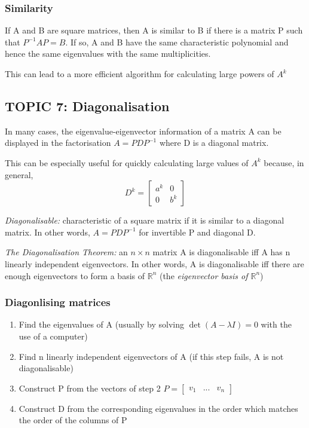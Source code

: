 \documentclass[12pt]{article} %
\newcommand{\R}{\mathbb{R}}
\begin{document}
\subsubsection{Similarity}
If A and B are square matrices, then A is similar to B if there is a matrix P such that $P^{-1} AP = B$. If so, A and B have the same characteristic polynomial and hence the same eigenvalues with the same multiplicities.

This can lead to a more efficient algorithm for calculating large powers of $A^k$

\subsection{TOPIC 7: Diagonalisation}
In many cases, the eigenvalue-eigenvector information of a matrix A can be displayed in the factorisation $A = PDP^{-1}$ where D is a diagonal matrix.

This can be especially useful for quickly calculating large values of $A^k$ because, in general, 
$$D^k = \begin{bmatrix}
	a^k & 0\\
	0 & b^k
\end{bmatrix}$$

\emph{Diagonalisable:} characteristic of a square matrix if it is similar to a diagonal matrix. In other words, $A = PDP^{-1}$ for invertible P and diagonal D. 

\emph{The Diagonalisation Theorem:} an $n \times n$ matrix A is diagonalisable iff A has n linearly independent eigenvectors. 
In other words, A is diagonalisable iff there are enough eigenvectors to form a basis of $\R^n$ (the \emph{eigenvector basis of $\R^n$})

\subsubsection{Diagonlising matrices}
\begin{enumerate}
	\item Find the eigenvalues of A (usually by solving $\det (A - \lambda I) = 0$ with the use of a computer)
	\item Find n linearly independent eigenvectors of A (if this step fails, A is not diagonalisable)
	\item Construct P from the vectors of step 2 $P = \begin{bmatrix}
		v_1 & ... & v_n
	\end{bmatrix}$
	\item Construct D from the corresponding eigenvalues in the order which matches the order of the columns of P 
\end{enumerate}
\end{document}
